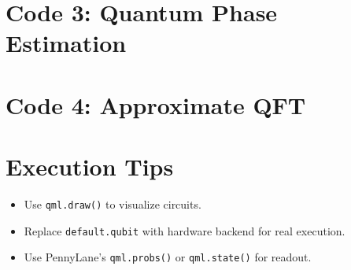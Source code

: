 \documentclass[12pt]{book}
\begin{document}
\section{Code 3: Quantum Phase Estimation}


\section{Code 4: Approximate QFT}


\section{Execution Tips}
\begin{itemize}
    \item Use \texttt{qml.draw()} to visualize circuits.
    \item Replace \texttt{default.qubit} with hardware backend for real execution.
    \item Use PennyLane’s \texttt{qml.probs()} or \texttt{qml.state()} for readout.
\end{itemize}
\end{document}
